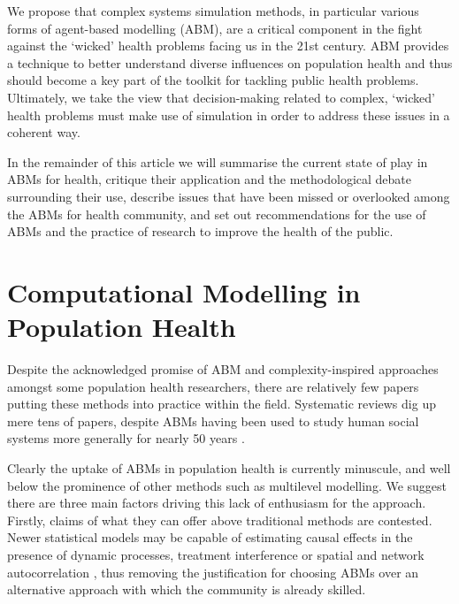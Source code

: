 \documentclass[review]{elsarticle}
\begin{document}
We propose that complex systems simulation methods, in particular various forms of agent-based modelling (ABM), are a critical component in the fight against the `wicked' health problems facing us in the 21st century.  ABM provides a technique to better understand diverse influences on population health and thus should become a key part of the toolkit for tackling public health problems.  Ultimately, we take the view that decision-making related to complex, `wicked' health problems must make use of simulation in order to address these issues in a coherent way. 

In the remainder of this article we will summarise the current state of play in ABMs for health, critique their application and the methodological debate surrounding their use, describe issues that have been missed or overlooked among the ABMs for health community, and set out recommendations for the use of ABMs and the practice of research to improve the health of the public.


\section{Computational Modelling in Population Health}

Despite the acknowledged promise of ABM and complexity-inspired approaches amongst some population health researchers, there are relatively few papers putting these methods into practice within the field.  Systematic reviews dig up mere tens of papers, despite ABMs having been used to study human social systems more generally for nearly 50 years \citep{nianogo2015}. 

Clearly the uptake of ABMs in population health is currently minuscule, and well below the prominence of other methods such as multilevel modelling.  We suggest there are three main factors driving this lack of enthusiasm for the approach. Firstly, claims of what they can offer above traditional methods are contested. Newer statistical models may be capable of estimating causal effects in the presence of dynamic processes, treatment interference or spatial and network autocorrelation \citep{naimi2016}, thus removing the justification for choosing ABMs over an alternative approach with which the community is already skilled. 
\end{document}
